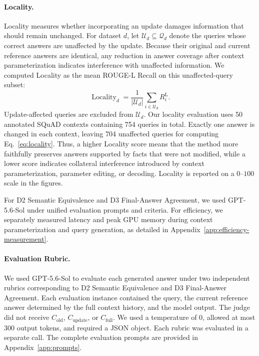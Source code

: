 \paragraph{Locality.}
Locality measures whether incorporating an update damages information that should remain unchanged. For dataset $d$, let $\mathcal{U}_d\subseteq\mathcal{Q}_d$ denote the queries whose correct answers are unaffected by the update. Because their original and current reference answers are identical, any reduction in answer coverage after context parameterization indicates interference with unaffected information. We computed Locality as the mean ROUGE-L Recall on this unaffected-query subset:
\begin{equation}
\operatorname{Locality}_d
=
\frac{1}{|\mathcal{U}_d|}
\sum_{i\in\mathcal{U}_d}
R_i^{\mathrm{L}}.
\label{eq:locality}
\end{equation}
Update-affected queries are excluded from $\mathcal{U}_d$. Our locality evaluation uses 50 annotated SQuAD contexts containing 754 queries in total. Exactly one answer is changed in each context, leaving 704 unaffected queries for computing Eq.~\ref{eq:locality}. Thus, a higher Locality score means that the method more faithfully preserves answers supported by facts that were not modified, while a lower score indicates collateral interference introduced by context parameterization, parameter editing, or decoding. Locality is reported on a $0$--$100$ scale in the figures.

For D2 Semantic Equivalence and D3 Final-Answer Agreement, we used GPT-5.6-Sol under unified evaluation prompts and criteria. For efficiency, we separately measured latency and peak GPU memory during context parameterization and query generation, as detailed in Appendix~\ref{app:efficiency-measurement}.


\paragraph{Evaluation Rubric.}
\label{app:evaluation-rubric}

We used GPT-5.6-Sol to evaluate each generated answer under two independent rubrics corresponding to D2 Semantic Equivalence and D3 Final-Answer Agreement. Each evaluation instance contained the query, the current reference answer determined by the full context history, and the model output. The judge did not receive $C_{\mathrm{old}}$, $C_{\mathrm{update}}$, or $C_{\mathrm{full}}$. We used a temperature of 0, allowed at most 300 output tokens, and required a JSON object. Each rubric was evaluated in a separate call. The complete evaluation prompts are provided in Appendix~\ref{app:prompts}.

